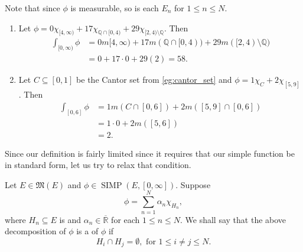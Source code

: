 \documentclass[notoc,notitlepage]{tufte-book}
\DeclareMathOperator{\SIMP}{SIMP}
\begin{document}
\begin{note}
  Note that since $\phi$ is measurable, so is each $E_n$ for $1 \leq n \leq N$.
\end{note}

\begin{eg}
  \begin{enumerate}
    \item Let $\phi = 0 \chi_{[4, \infty)} + 17 \chi_{\mathbb{Q} \cap [0, 4)} +
      29 \chi_{[2, 4) \setminus \mathbb{Q}}$. Then
      \begin{align*}
        \int_{[0, \infty)} \phi &= 0 m[4, \infty) + 17 m(\mathbb{Q} \cap [0, 4))
                                  + 29 m([2, 4) \setminus \mathbb{Q}) \\
                                &= 0 + 17 \cdot 0 + 29 (2) = 58.
      \end{align*}
    \item Let $C \subseteq [0, 1]$ be the Cantor set from \cref{eg:cantor_set}
      and $\phi = 1 \chi_C + 2 \chi_{[5, 9]}$. Then
      \begin{align*}
        \int_{[0, 6]} \phi
        &= 1 m(C \cap [0, 6]) + 2 m([5, 9] \cap [0, 6]) \\
        &= 1 \cdot 0 + 2 m([5, 6]) \\
        &= 2.
      \end{align*}
  \end{enumerate}
\end{eg}

Since our definition is fairly limited since it requires that our simple
function be in standard form, let us try to relax that condition.

\begin{defn}\label{defn:disjoint_representation}
  Let $E \in \mathfrak{M}(E)$ and $\phi \in \SIMP(E, [0, \infty])$. Suppose
  \begin{equation*}
    \phi = \sum_{n=1}^{N} \alpha_n \chi_{H_n},
  \end{equation*}
  where $H_n \subseteq E$ is  and $\alpha_n \in
  \overline{\mathbb{R}}$ for each $1 \leq n \leq N$.  We shall say that the
  above decomposition of $\phi$ is a  of
  $\phi$ if
  \begin{equation*}
    H_i \cap H_j = \emptyset, \text{ for } 1 \leq i \neq j \leq N.
  \end{equation*}
\end{defn}
\end{document}
